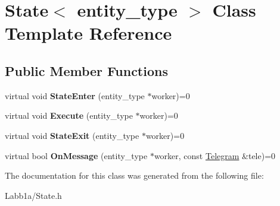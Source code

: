 \hypertarget{class_state}{}\section{State$<$ entity\+\_\+type $>$ Class Template Reference}
\label{class_state}
\subsection*{Public Member Functions}
\begin{DoxyCompactItemize}
\item 
\hypertarget{class_state_a1c2dad408fca149fc9d8f8dd62c5af1f}{}virtual void {\bfseries State\+Enter} (entity\+\_\+type $\ast$worker)=0\label{class_state_a1c2dad408fca149fc9d8f8dd62c5af1f}

\item 
\hypertarget{class_state_afbc08bc5a96c16658ab00e22cc5e4ef3}{}virtual void {\bfseries Execute} (entity\+\_\+type $\ast$worker)=0\label{class_state_afbc08bc5a96c16658ab00e22cc5e4ef3}

\item 
\hypertarget{class_state_afaedc91ca20b78d3ef2774db4020ff89}{}virtual void {\bfseries State\+Exit} (entity\+\_\+type $\ast$worker)=0\label{class_state_afaedc91ca20b78d3ef2774db4020ff89}

\item 
\hypertarget{class_state_adf18af1793d77f8a0f72e9c92a056d6e}{}virtual bool {\bfseries On\+Message} (entity\+\_\+type $\ast$worker, const \hyperlink{struct_telegram}{Telegram} \&tele)=0\label{class_state_adf18af1793d77f8a0f72e9c92a056d6e}

\end{DoxyCompactItemize}


The documentation for this class was generated from the following file\+:\begin{DoxyCompactItemize}
\item 
Labb1a/State.\+h\end{DoxyCompactItemize}
